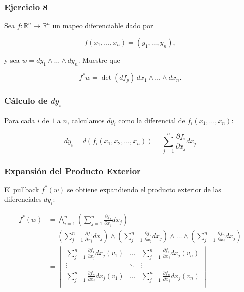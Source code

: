 \documentclass{beamer}
\begin{document}
\begin{frame}
\frametitle{Ejercicio 8}

Sea \( f:\mathbb{R}^{n} \to \mathbb{R}^{n} \) un mapeo diferenciable dado por 

\[ f(x_{1},\dots,x_{n}) = (y_{1},\dots,y_{n}), \]

y sea \( w = dy_{1} \wedge \dots \wedge dy_{n}. \) Muestre que 

\[ f^{*}w = \det(df_{p}) \, dx_{1} \wedge \dots \wedge dx_{n}. \]

\end{frame}

\begin{frame}
\frametitle{Cálculo de \( dy_{i} \)}
Para cada \( i \) de \( 1 \) a \( n \), calculamos \( dy_{i} \) como la diferencial de \( f_{i}(x_{1}, \dots, x_{n}) \):

   \[ dy_{i} = d(f_{i}(x_{1}, x_{2}, \dots, x_{n})) = \sum_{j=1}^{n} \frac{\partial f_{i}}{\partial x_{j}} dx_{j} \]
   
\end{frame}
\begin{frame}
\frametitle{Expansión del Producto Exterior}
   El pullback \( f^{*}(w) \) se obtiene expandiendo el producto exterior de las diferenciales \( dy_{i} \):
   
 \begin{align*}
 f^{*}(w) &= \bigwedge_{i=1}^{n} \left( \sum_{j=1}^{n} \frac{\partial f_{i}}{\partial x_{j}} dx_{j} \right) \\
 &=\left( \sum_{j=1}^{n} \frac{\partial f_{1}}{\partial x_{j}} dx_{j} \right) \wedge \left( \sum_{j=1}^{n} \frac{\partial f_{2}}{\partial x_{j}} dx_{j} \right) \wedge \dots \wedge \left( \sum_{j=1}^{n} \frac{\partial f_{n}}{\partial x_{j}} dx_{j} \right) \\
 &= \begin{vmatrix}
    \sum_{j=1}^{n} \frac{\partial f_{1}}{\partial x_{j}} dx_{j}(v_1) & \dots & \sum_{j=1}^{n} \frac{\partial f_{1}}{\partial x_{j}} dx_{j}(v_n) \\
     \vdots& \ddots& \vdots\\
    \sum_{j=1}^{n} \frac{\partial f_{n}}{\partial x_{j}} dx_{j} (v_1) & \dots & \sum_{j=1}^{n} \frac{\partial f_{n}}{\partial x_{j}} dx_{j} (v_n)\\
    \end{vmatrix}
 \end{align*}
\end{frame}
\end{document}
